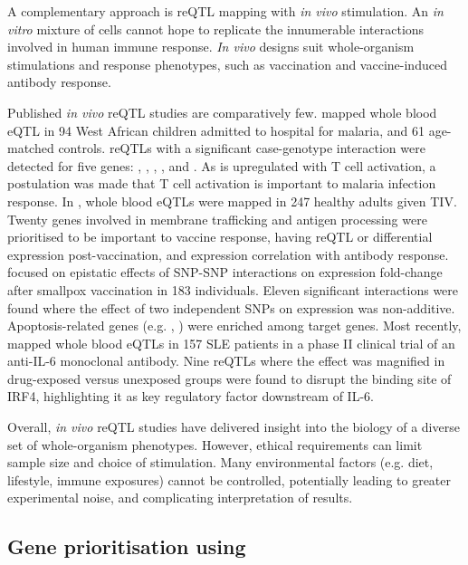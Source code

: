 \begin{outline}
A complementary approach is \gls{reQTL} mapping with \textit{in vivo} stimulation.
An \textit{in vitro} mixture of cells cannot hope to replicate the innumerable interactions involved in human immune response.
\textit{In vivo} designs suit whole-organism stimulations and response phenotypes,
such as vaccination and vaccine-induced antibody response.

Published \textit{in vivo} \gls{reQTL} studies are comparatively few.
\textcite{idaghdour2012EvidenceAdditiveInteraction} mapped whole blood \gls{eQTL} in 94 West African children admitted to hospital for malaria, and 61 age-matched controls.
\glspl{reQTL} with a significant case-genotype interaction were detected for five genes:
, , , , and .
As  is upregulated with T cell activation, a postulation was made that T cell activation is important to malaria infection response.
In \textcite{franco2013IntegrativeGenomicAnalysis}, whole blood \glspl{eQTL} were mapped in 247 healthy adults given \gls{TIV}.
Twenty genes involved in membrane trafficking and antigen processing were prioritised to be important to vaccine response,
having \gls{reQTL} or differential expression post-vaccination, and expression correlation with antibody response.
\textcite{lareau2016InteractionQuantitativeTrait} focused on epistatic effects of \gls{SNP}-\gls{SNP} interactions on expression fold-change after smallpox vaccination in 183 individuals.
Eleven significant interactions were found where the effect of two independent \glspl{SNP} on expression was non-additive.
Apoptosis-related genes (e.g. , ) were enriched among target genes.
Most recently, \textcite{davenport2018DiscoveringVivoCytokineeQTL}
mapped whole blood \glspl{eQTL} in 157 \gls{SLE} patients in a phase II clinical trial of an anti-IL-6 monoclonal antibody.
Nine \glspl{reQTL} where the effect was magnified in drug-exposed versus unexposed groups
were found to disrupt the binding site of IRF4,
highlighting it as key regulatory factor downstream of IL-6.

Overall, \textit{in vivo} \gls{reQTL} studies have delivered insight into the biology of a diverse set of whole-organism phenotypes.
However, ethical requirements can limit sample size and choice of stimulation.
Many environmental factors (e.g. diet, lifestyle, immune exposures) cannot be controlled, 
potentially leading to greater experimental noise, and complicating interpretation of results.

\subsection{Gene prioritisation using }


\end{outline}

